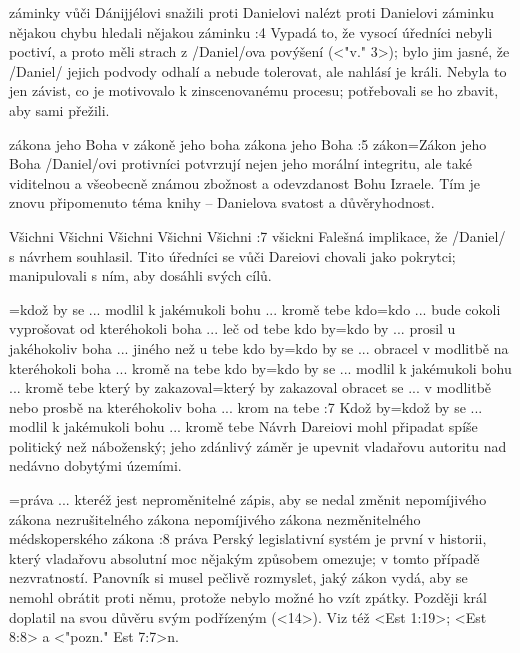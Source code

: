     {záminky vůči Dánijjélovi} %
    {snažili proti Danielovi nalézt}  %
    {proti Danielovi záminku} %
    {nějakou chybu}  %
    {hledali nějakou záminku}  %
:4 {} Vypadá to, že vysocí úředníci nebyli poctiví, a proto měli strach z \x/Daniel/ova povýšení (<"v." 3>); bylo jim jasné, že  \x/Daniel/ jejich podvody odhalí a nebude tolerovat, ale nahlásí je králi. Nebyla to jen závist, co je motivovalo k zinscenovanému procesu; potřebovali se ho zbavit, aby sami přežili.

    {zákona jeho Boha} %
    {v zákoně jeho boha}  %
    {zákona jeho Boha} %
    {}  %
    {}  %
:5 {zákon}={Zákon jeho Boha}  \x/Daniel/ovi protivníci potvrzují nejen jeho morální integritu, ale také viditelnou a všeobecně známou zbožnost a odevzdanost Bohu Izraele. Tím je znovu připomenuto téma knihy -- Danielova svatost a důvěryhodnost.

    {Všichni}  %
    {Všichni}  %
    {Všichni}  %
    {Všichni}  %
    {Všichni}  %
:7 {všickni} Falešná implikace, že \x/Daniel/ s návrhem souhlasil. Tito úředníci se vůči Dareiovi chovali jako pokrytci; manipulovali s ním, aby dosáhli svých cílů.   

={kdož by se ... modlil k jakémukoli bohu ... kromě tebe}  %
    {kdo}={kdo ... bude cokoli vyprošovat od kteréhokoli boha ... leč od tebe}  %
    {kdo by}={kdo by ... prosil u jakéhokoliv boha ... jiného než u tebe}  %
    {kdo by}={kdo by se ... obracel v modlitbě na kteréhokoli boha ... kromě na tebe}  %
    {kdo by}={kdo by se ... modlil k jakémukoli bohu ... kromě tebe}  %
    {který by zakazoval}={který by zakazoval obracet se ... v modlitbě nebo prosbě na kteréhokoliv boha ... krom na tebe}  %
:7 {Kdož by}={kdož by se ... modlil k jakémukoli bohu ... kromě tebe} Návrh Dareiovi mohl připadat spíše politický než náboženský; jeho zdánlivý záměr je upevnit vladařovu autoritu nad nedávno dobytými územími. 

={práva ... kteréž jest neproměnitelné}  %
    {zápis, aby se nedal změnit}  %
    {nepomíjivého zákona}  %
    {nezrušitelného zákona}  %
    {nepomíjivého zákona}  %
    {nezměnitelného médskoperského zákona}  %
:8 {práva} Perský legislativní systém je první v historii, který vladařovu absolutní moc nějakým způsobem omezuje; v tomto případě nezvratností. Panovník si musel pečlivě rozmyslet, jaký zákon vydá, aby se nemohl obrátit proti němu, protože nebylo možné ho vzít zpátky.
Později král doplatil na svou důvěru svým podřízeným (<14>).
Viz též <Est 1:19>;  <Est 8:8> a <"pozn." Est 7:7>n.

